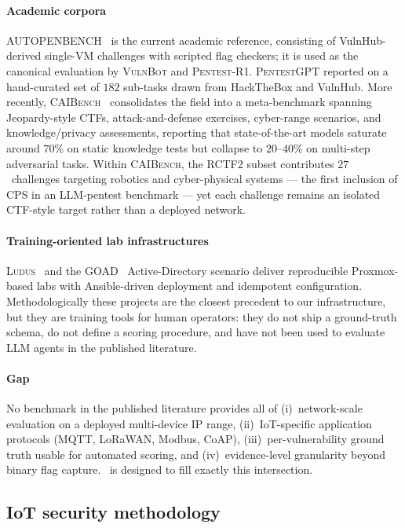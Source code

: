 \paragraph{Academic corpora}
AUTOPENBENCH~\cite{autopenbench24} is the current academic reference,
consisting of VulnHub-derived single-VM challenges with scripted flag
checkers; it is used as the canonical evaluation by
\textsc{VulnBot} and \textsc{Pentest-R1}. \textsc{PentestGPT} reported on a
hand-curated set of $182$ sub-tasks drawn from HackTheBox and VulnHub. More
recently, \textsc{CAIBench}~\cite{caibench25} consolidates the field into a
meta-benchmark spanning Jeopardy-style CTFs, attack-and-defense exercises,
cyber-range scenarios, and knowledge/privacy assessments, reporting that
state-of-the-art models saturate around $70\%$ on static knowledge tests but
collapse to $20$--$40\%$ on multi-step adversarial tasks. Within \textsc{CAIBench},
the RCTF2 subset contributes $27$~challenges targeting robotics and
cyber-physical systems --- the first inclusion of CPS in an LLM-pentest
benchmark --- yet each challenge remains an isolated CTF-style target rather
than a deployed network.

\paragraph{Training-oriented lab infrastructures}
\textsc{Ludus}~\cite{ludus} and the \textsc{GOAD}~\cite{goad} Active-Directory
scenario deliver reproducible Proxmox-based labs with Ansible-driven
deployment and idempotent configuration. Methodologically these projects are
the closest precedent to our infrastructure, but they are training tools for
human operators: they do not ship a ground-truth schema, do not define a
scoring procedure, and have not been used to evaluate LLM agents in the
published literature.

\paragraph{Gap}
No benchmark in the published literature provides all of
(i)~network-scale evaluation on a deployed multi-device IP range,
(ii)~IoT-specific application protocols (MQTT, LoRaWAN, Modbus, CoAP),
(iii)~per-vulnerability ground truth usable for automated scoring, and
(iv)~evidence-level granularity beyond binary flag capture. \systemname\ is
designed to fill exactly this intersection.

\subsection{IoT security methodology}
\label{sec:related:iot}

